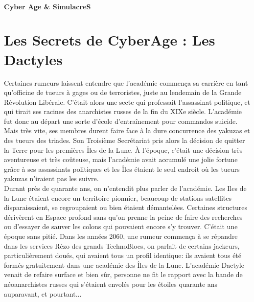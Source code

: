 \documentclass[11pt,twoside,a4paper]{article}
\title{\txtTITLE}
\date{ --- }
\def\txtTITLE{Cyber Age \& SimulacreS} %
\begin{document}
\setlength\parindent{0pt} %

~\\

\vfill

\begin{center}
	\textbf{\Huge \txtTITLE}
\end{center}

\vfill

\tableofcontents

\clearpage

\section{Les Secrets de CyberAge : Les Dactyles}

\begin{multicols}{3}
\scriptsize{
Certaines rumeurs laissent entendre que l'acad{\'e}mie commen\c{c}a sa carri{\`e}re en tant qu'officine de tueurs {\`a} gages ou de terroristes, juste au lendemain de la Grande R{\'e}volution Lib{\'e}rale. C'{\'e}tait alors une secte qui professait l'assassinat politique, et qui tirait ses racines des anarchistes russes de la fin du XIXe si{\`e}cle. L'acad{\'e}mie fut donc au d{\'e}part une sorte d'{\'e}cole d'entra{\^i}nement pour commandos suicide. Mais tr{\`e}s vite, ses membres durent faire face {\`a} la dure concurrence des yakuzas et des tueurs des triades. Son Troisi{\`e}me Secr{\'e}tariat pris alors la d{\'e}cision de quitter la Terre pour les premi{\`e}res {\^I}les de la Lune. {\`A} l'{\'e}poque, c'{\'e}tait une d{\'e}cision tr{\`e}s aventureuse et tr{\`e}s co{\^u}teuse, mais l'acad{\'e}mie avait accumul{\'e} une jolie fortune gr{\^a}ce {\`a} ses assassinats politiques et les {\^I}les {\'e}taient le seul endroit o{\`u} les tueurs yakuzas n'iraient pas les suivre.~\\

Durant pr{\`e}s de quarante ans, on n'entendit plus parler de l'acad{\'e}mie. Les Iles de la Lune {\'e}taient encore un territoire pionnier, beaucoup de stations satellites disparaissaient, se regroupaient ou bien {\'e}taient d{\'e}mantel{\'e}es. Certaines structures d{\'e}riv{\`e}rent en Espace profond sans qu'on prenne la peine de faire des recherches ou d'essayer de sauver les colons qui pouvaient encore s'y trouver. C'{\'e}tait une {\'e}poque sans piti{\'e}. Dans les ann{\'e}es 2060, une rumeur commen\c{c}a {\`a} se r{\'e}pandre dans les services R{\'e}zo des grands TechnoBlocs, on parlait de certains jackeurs, particuli{\`e}rement dou{\'e}s, qui avaient tous un profil identique: ils avaient tous {\'e}t{\'e} form{\'e}s gratuitement dans une acad{\'e}mie des {\^I}les de la Lune. L'acad{\'e}mie Dactyle venait de refaire surface et bien s{\^u}r, personne ne fit le rapport avec la bande de n{\'e}oanarchistes russes qui s'{\'e}taient envol{\'e}s pour les {\'e}toiles quarante ans auparavant, et pourtant...~\\

}
\end{multicols}
\end{document}
